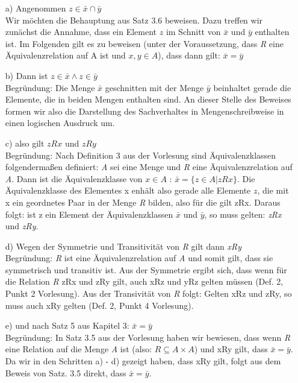 \documentclass[11pt,a4paper]{article}
\begin{document}
\begin{itemize}
\item[a)] Angenommen $z \in \bar{x} \cap \bar{y}$ \\
Wir möchten die Behauptung aus Satz 3.6 beweisen. Dazu treffen wir zunächst die Annahme, dass ein Element $z$ im Schnitt von $\bar{x}$ und $\bar{y}$ enthalten ist. Im Folgenden gilt es zu beweisen (unter der Voraussetzung, dass \emph{R} eine Äquivalenzrelation auf A ist und $x,y \in A$), dass dann gilt: $\bar{x} = \bar{y}$
\item[b)] Dann ist $z \in \bar{x} \land z \in \bar{y}$ \\
Begründung: Die Menge $\bar{x}$ geschnitten mit der Menge $\bar{y}$ beinhaltet gerade die Elemente, die in beiden Mengen enthalten sind. An dieser Stelle des Beweises formen wir also die Darstellung des Sachverhaltes in Mengenschreibweise in einen logischen Ausdruck um.
\item[c)] also gilt $zRx$ und $zRy$ \\
Begründung: Nach Definition 3 aus der Vorlesung sind Äquivalenzklassen folgendermaßen definiert: \emph{A} sei eine Menge und \emph{R} eine Äquivalenzrelation auf \emph{A}. Dann ist die Äquivalenzklasse von $x \in A$ : $ \bar{x} = \{ z \in A | zRx \}$. Die Äquivalenzklasse des Elementes x enhält also gerade alle Elemente $z$, die mit x ein geordnetes Paar in der Menge \emph{R} bilden, also für die gilt zRx. Daraus folgt: ist z ein Element der Äquivalenzklassen $\bar{x}$ und $\bar{y}$, so muss gelten: \emph{zRx} und \emph{zRy}.
\item[d)]  Wegen der Symmetrie und Transitivität von \emph{R} gilt dann \emph{xRy} \\
Begründung: \emph{R} ist eine Äquivalenzrelation auf \emph{A} und somit gilt, dass sie symmetrisch und transitiv ist. Aus der Symmetrie ergibt sich, dass wenn für die Relation \emph{R} zRx und zRy gilt, auch xRz und yRz gelten müssen (Def. 2, Punkt 2 Vorlesung). Aus der Transivität von \emph{R} folgt: Gelten xRz und zRy, so muss auch xRy gelten (Def. 2, Punkt 4 Vorlesung).
\item[e)] und nach Satz 5 aus Kapitel 3: $\bar{x} = \bar{y}$ \\
Begründung: In Satz 3.5 aus der Vorlesung haben wir bewiesen, dass wenn \emph{R} eine Relation auf die Menge \emph{A} ist (also: $R \subseteq A \times A$) und xRy gilt, dass $\bar{x} = \bar{y}$. Da wir in den Schritten a) - d) gezeigt haben, dass xRy gilt, folgt aus dem Beweis von Satz. 3.5 direkt, dass $\bar{x} = \bar{y}$.
\end{itemize}
\end{document}
